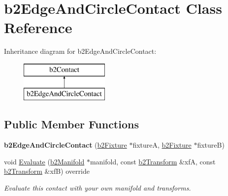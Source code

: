 \hypertarget{classb2_edge_and_circle_contact}{}\section{b2\+Edge\+And\+Circle\+Contact Class Reference}
\label{classb2_edge_and_circle_contact}
Inheritance diagram for b2\+Edge\+And\+Circle\+Contact\+:\begin{figure}[H]
\begin{center}
\leavevmode
\includegraphics[height=2.000000cm]{classb2_edge_and_circle_contact}
\end{center}
\end{figure}
\subsection*{Public Member Functions}
\begin{DoxyCompactItemize}
\item 
\mbox{\label{classb2_edge_and_circle_contact_a9de91d6afe4d2407f679b2ccaded9c02}} 
{\bfseries b2\+Edge\+And\+Circle\+Contact} (\hyperlink{classb2_fixture}{b2\+Fixture} $\ast$fixtureA, \hyperlink{classb2_fixture}{b2\+Fixture} $\ast$fixtureB)
\item 
\mbox{\label{classb2_edge_and_circle_contact_aec021f688dcf2b5a2c483edde476d4b6}} 
void \hyperlink{classb2_edge_and_circle_contact_aec021f688dcf2b5a2c483edde476d4b6}{Evaluate} (\hyperlink{structb2_manifold}{b2\+Manifold} $\ast$manifold, const \hyperlink{structb2_transform}{b2\+Transform} \&xfA, const \hyperlink{structb2_transform}{b2\+Transform} \&xfB) override
\begin{DoxyCompactList}\small\item\em Evaluate this contact with your own manifold and transforms. \end{DoxyCompactList}\end{DoxyCompactItemize}
